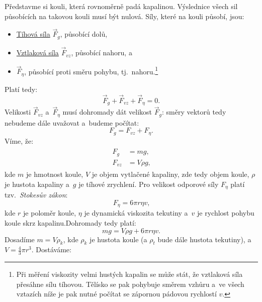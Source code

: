 \documentclass[12pt]{article}
\begin{document}
Představme si kouli, která rovnoměrně padá kapalinou. Výslednice všech sil působících na takovou kouli musí být nulová. Síly, které na kouli působí, jsou:
\begin{itemize}[noitemsep, topsep = 0pt]
    \item \underline{Tíhová síla} $\vec{F}_g$, působící dolů,
    \item \underline{Vztlaková síla} $\vec{F}_{vz}$, působící nahoru, a~    \item \underline{} $\vec{F}_\eta$, působící proti směru pohybu, tj.~nahoru.\footnote{Při měření viskozity velmi hustých kapalin se může stát, že vztlaková síla přesáhne sílu tíhovou. Tělísko se pak pohybuje směrem vzhůru a~ve všech vztazích níže je pak nutné počítat se zápornou pádovou rychlostí $v$.}
\end{itemize}
Platí tedy:
\begin{equation}
    \vec{F}_g + \vec{F}_{vz} + \vec{F}_\eta = 0\text{.}
\end{equation}
Velikosti $\vec{F}_{vz}$ a~$\vec{F}_\eta$ musí dohromady dát velikost $\vec{F}_g$: směry vektorů tedy nebudeme dále uvažovat a~budeme počítat:
\begin{equation}
    F_g = F_{vz} + F_\eta\text{.}
\end{equation}
Víme, že:
\begin{align}
    \begin{split}
        F_g &= mg\text{,}\\
        F_{vz} &= V\rho g\text{,}
    \end{split}
\end{align}
kde $m$ je hmotnost koule, $V$ je objem vytlačené kapaliny, zde tedy objem koule, $\rho$ je hustota kapaliny a~$g$ je tíhové zrychlení. Pro velikost odporové síly $F_\eta$ platí tzv.~\emph{Stokesův zákon}:~\cite{book:Calibration_of_viscometers}\cite{wiki:Stokes_law}
\begin{equation}
    F_\eta = 6\pi r\eta v\text{,}
\end{equation}
kde $r$ je poloměr koule, $\eta$ je dynamická viskozita tekutiny a~$v$ je rychlost pohybu koule skrz kapalinu.\footnotemark Dohromady tedy platí:
\begin{equation}
    mg = V\rho g + 6\pi r\eta v\text{.}
\end{equation}
Dosadíme $m = V\rho_k$, kde $\rho_k$ je hustota koule (a $\rho_t$ bude dále hustota tekutiny), a~$V = \frac{4}{3}\pi r^3$. Dostáváme:
\end{document}
